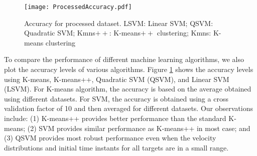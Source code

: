 \documentclass[letterpaper, 10 pt, conference]{ieeeconf}
\begin{document}
\begin{figure}[h!]
\centering
\captionsetup{justification=centering}
\texttt{[image: ProcessedAccuracy.pdf]}
\caption{Accuracy for processed dataset. LSVM: Linear SVM; QSVM: Quadratic SVM; Kmns$++$: K-means$++$ clustering; Kmns: K-means clustering}
\label{fig:ProcessedAccuracy}
\end{figure}

To compare the performance of different machine learning algorithms, we also plot the accuracy levels of various algorithms. Figure \ref{fig:ProcessedAccuracy} shows the accuracy levels using K-means, K-means++, Quadratic SVM (QSVM), and Linear SVM (LSVM). For K-means algorithm, the accuracy is based on the average obtained using different datasets. For SVM, the accuracy is obtained using a cross validation factor of 10 and then averaged for different datasets. Our observations include: (1) K-means++ provides better performance than the standard K-means; (2) SVM provides similar performance as K-means++ in most case; and (3) QSVM provides most robust performance even when the velocity distributions and initial time instants for all targets are in a small range. 


\end{document}
